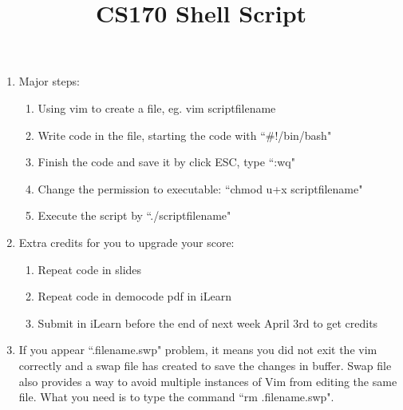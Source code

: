 \documentclass[11pt]{article}
\title{CS170  Shell Script}
\author{}
\begin{document}
\maketitle
\begin{enumerate}
\item Major steps:
\begin{enumerate}
\item Using vim to create a file, eg. vim scriptfilename
\item Write code in the file, starting the code with ``\#!/bin/bash"
\item Finish the code and save it by click ESC, type  ``:wq"
\item Change the permission to executable: ``chmod u+x scriptfilename"
\item Execute the script by ``./scriptfilename"
\end{enumerate}

\item Extra credits for you to upgrade your score:
\begin{enumerate}
\item Repeat code in slides
\item Repeat code in democode pdf in iLearn
\item Submit in iLearn before the end of next week April 3rd to get credits
\end{enumerate}

\item If you appear ``.filename.swp" problem, it means you did not exit the vim correctly and a swap file has created to save the changes in buffer. Swap file also provides a way to avoid multiple instances of Vim from editing the same file. What you need is to type the command ``rm .filename.swp". 

\end{enumerate}
\end{document}
